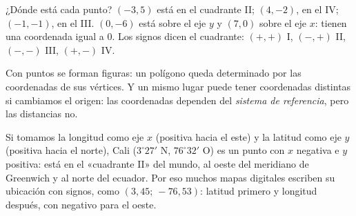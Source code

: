 \documentclass[11pt]{article}
\begin{document}
\begin{ejemplo}
¿Dónde está cada punto? $(-3, 5)$ está en el cuadrante II; $(4, -2)$, en el
IV; $(-1, -1)$, en el III. $(0, -6)$ está sobre el eje $y$ y $(7, 0)$ sobre el
eje $x$: tienen una coordenada igual a $0$. Los signos dicen el cuadrante:
$(+,+)$ I, $(-,+)$ II, $(-,-)$ III, $(+,-)$ IV.

\begin{center}
\end{center}
\end{ejemplo}

Con puntos se forman figuras: un polígono queda determinado por las
coordenadas de sus vértices. Y un mismo lugar puede tener coordenadas distintas
si cambiamos el origen: las coordenadas dependen del \emph{sistema de
referencia}, pero las distancias no.

\begin{aplicacion}
Si tomamos la longitud como eje $x$ (positiva hacia el este) y la latitud como
eje $y$ (positiva hacia el norte), Cali ($3^\circ 27'$ N, $76^\circ 32'$ O) es
un punto con $x$ negativa e $y$ positiva: está en el «cuadrante II» del mundo,
al oeste del meridiano de Greenwich y al norte del ecuador. Por eso muchos
mapas digitales escriben su ubicación con signos, como $(3{,}45;\ -76{,}53)$:
latitud primero y longitud después, con negativo para el oeste.
\end{aplicacion}
\end{document}
